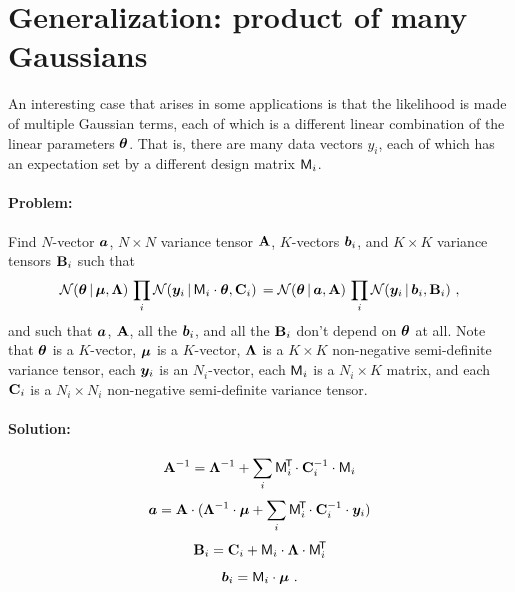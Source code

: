 \section{Generalization: product of many Gaussians}

An interesting case that arises in some applications is that the
likelihood is made of multiple Gaussian terms, each of which is a
different linear combination of the linear parameters $\boldsymbol{\theta}$.
That is, there are many data vectors $y_i$, each of which has an expectation
set by a different design matrix $\mathsf{M}_i$.

\paragraph{Problem:}
Find $N$-vector $\boldsymbol{a}$, $N\times N$ variance tensor $\mathbf{A}$, $K$-vectors $\boldsymbol{b}_i$,
and $K\times K$ variance tensors $\mathbf{B}_i$ such that
\begin{equation}\label{eq:genproblem}
\mathcal{N}\!\,(\boldsymbol{\theta}\,|\,\boldsymbol{\mu},\mathbf{\Lambda})\,\prod_i\mathcal{N}\!\,(\boldsymbol{y}_i\,|\,\mathsf{M}_i\cdot\boldsymbol{\theta},\mathbf{C}_i)\,
 = \mathcal{N}\!\,(\boldsymbol{\theta}\,|\,\boldsymbol{a},\mathbf{A})\,\prod_i\mathcal{N}\!\,(\boldsymbol{y}_i\,|\,\boldsymbol{b}_i,\mathbf{B}_i) ~ ,
\end{equation}
and such that $\boldsymbol{a}$, $\mathbf{A}$, all the $\boldsymbol{b}_i$, and all the $\mathbf{B}_i$
don't depend on $\boldsymbol{\theta}$ at all.
Note that
$\boldsymbol{\theta}$ is a $K$-vector,
$\boldsymbol{\mu}$ is a $K$-vector,
$\mathbf{\Lambda}$ is a $K\times K$ non-negative semi-definite variance tensor,
each $\boldsymbol{y}_i$ is an $N_i$-vector,
each $\mathsf{M}_i$ is a $N_i\times K$ matrix,
and
each $\mathbf{C}_i$ is a $N_i\times N_i$ non-negative semi-definite variance tensor.

\paragraph{Solution:}

\begin{equation}\label{eq:A}
\mathbf{A}^{-1} = \mathbf{\Lambda}^{-1} + \sum_i\mathsf{M}_i^{\!\mathsf{T}\!} \cdot \mathbf{C}_i^{-1} \cdot \mathsf{M}_i
\end{equation}
\begin{equation}\label{eq:a}
\boldsymbol{a} = \mathbf{A} \cdot (\mathbf{\Lambda}^{-1} \cdot \boldsymbol{\mu} + \sum_i\mathsf{M}_i^{\!\mathsf{T}\!} \cdot \mathbf{C}_i^{-1} \cdot \boldsymbol{y}_i)
\end{equation}
\begin{equation}\label{eq:B}
\mathbf{B}_i = \mathbf{C}_i + \mathsf{M}_i \cdot \mathbf{\Lambda} \cdot \mathsf{M}_i^{\!\mathsf{T}\!}
\end{equation}
\begin{equation}\label{eq:b}
\boldsymbol{b}_i = \mathsf{M}_i \cdot \boldsymbol{\mu}
~ .
\end{equation}


